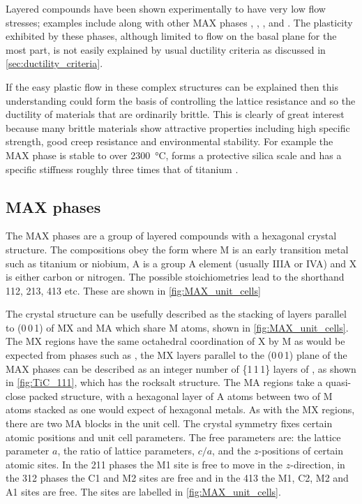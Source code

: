 
Layered compounds have been shown experimentally to have very low flow stresses; examples include  along with other MAX phases \cite{Barsoum2011},  \cite{Korte2012NbCo},  \cite{Telle2006},  and  \cite{Sygnatowicz2015}. The plasticity exhibited by these phases, although limited to flow on the basal plane for the most part, is not easily explained by usual ductility criteria as discussed in \autoref{sec:ductility_criteria}. 

If the easy plastic flow in these complex structures can be explained then this understanding could form the basis of controlling the lattice resistance and so the ductility of materials that are ordinarily brittle. This is clearly of great interest because many brittle materials show attractive properties including high specific strength, good creep resistance and environmental stability. For example the MAX phase  is stable to over \SI{2300}{\celsius}, forms a protective silica scale and has a specific stiffness roughly three times that of titanium \cite{Radovic2013}.

\subsection{MAX phases}

The MAX phases are a group of layered compounds with a hexagonal crystal structure. The compositions obey the form  where M is an early transition metal such as titanium or niobium, A is a group A element (usually IIIA or IVA) and X is either carbon or nitrogen. The possible stoichiometries lead to the shorthand 112, 213, 413 etc. These are shown in \autoref{fig:MAX_unit_cells}

The crystal structure can be usefully described as the stacking of layers parallel to (0\,0\,1) of MX and MA which share M atoms,  shown in \autoref{fig:MAX_unit_cells}. The MX regions have the same octahedral coordination of X by M as would be expected from phases such as , the MX layers parallel to the (0\,0\,1) plane of the MAX phases can be described as an integer number of \{1\,1\,1\} layers of , as shown in \autoref{fig:TiC_111}, which has the rocksalt structure. The MA regions take a quasi-close packed structure, with a hexagonal layer of A atoms between two of M atoms stacked as one would expect of hexagonal metals. As with the MX regions, there are two MA blocks in the unit cell. The crystal symmetry fixes certain atomic positions and unit cell parameters. The free parameters are: the lattice parameter $a$, the ratio of lattice parameters, $c/a$, and the $z$-positions of certain atomic sites. In the 211 phases the M1 site is free to move in the $z$-direction, in the 312 phases the C1 and M2 sites are free and in the 413 the M1, C2, M2 and A1 sites are free. The sites are labelled in \autoref{fig:MAX_unit_cells}.



